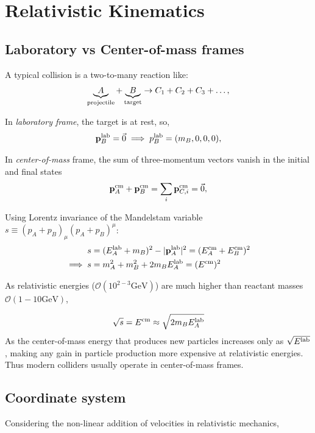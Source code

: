 





\section{Relativistic Kinematics}
\subsection{Laboratory vs Center-of-mass frames}
A typical collision is a two-to-many reaction like:
\begin{equation}
\underbrace{A}_{\rm projectile} + \underbrace{B}_{\rm target} \rightarrow C_1 + C_2 + C_3 + \ldots,
\end{equation}

In \emph{laboratory frame}, the target is at rest, so,
\begin{equation}
	\mathbf{p}_B^{\rm lab} = \vec{0} \implies p_{B}^{\rm lab} = (m_B, 0, 0, 0),
\end{equation}

In \emph{center-of-mass} frame, the sum of three-momentum vectors vanish in the initial and final states
\begin{equation}
	\mathbf{p}_A^{\rm cm} + \mathbf{p}_B^{\rm cm} =\sum_i \mathbf{p}_{C, i}^{\rm cm} = \vec{0},
\end{equation}

Using Lorentz invariance of the Mandelstam variable \(s \equiv (p_A + p_B)_\mu(p_A + p_B)^\mu\):
\begin{align}
	s &= (E^{\rm lab}_A + m_B)^2 - |\mathbf{p}^{\rm lab}_A|^2 = (E^{\rm cm}_A + E^{\rm cm}_B)^2 \notag \\
	\implies s &= m_A^2 + m_B^2  + 2m_BE^{\rm lab}_A = (E^{\rm cm})^2 
\end{align}

As relativistic energies (\(\mathcal{O}(10^{2-3} \mathrm{GeV})\)) are much higher than reactant masses \(\mathcal{O}(1-10 \mathrm{GeV})\), 

\begin{equation}
	\sqrt{s} = E^{\rm cm} \approx \sqrt{2m_BE^{\rm lab}_A}
\end{equation}
As the center-of-mass energy that produces new particles increases only as \(\sqrt{E^{\rm lab}}\) , making any gain in particle production more expensive at relativistic energies. Thus modern colliders usually operate in center-of-mass frames.

\subsection{Coordinate system}
Considering the non-linear addition of velocities in relativistic mechanics,

